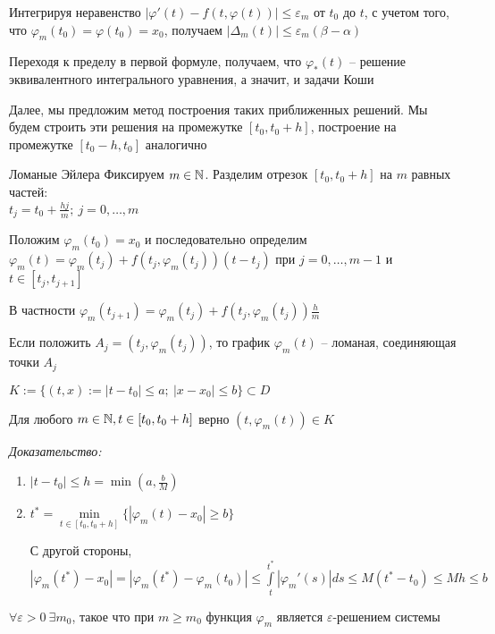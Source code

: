 \documentclass[12pt]{article}
\begin{document}
Интегрируя неравенство $|\varphi'(t) - f(t, \varphi(t))| \leq \varepsilon_m$ от $t_0$ до $t$, с учетом того, что $\varphi_m(t_0) = \varphi(t_0) = x_0$, получаем $|\Delta_m(t)| \leq \varepsilon_m(\beta - \alpha)$

Переходя к пределу в первой формуле, получаем, что $\varphi_*(t)$ -- решение эквивалентного интегрального уравнения, а значит, и задачи Коши 

\begin{Remark}{}
    Далее, мы предложим метод построения таких приближенных решений. Мы будем строить эти решения на промежутке $[t_0, t_0 + h]$, построение на промежутке $[t_0 - h, t_0]$ аналогично
\end{Remark}

\begin{defin}{Ломаные Эйлера}
    Фиксируем $m \in \mathbb N$. Разделим отрезок $[t_0, t_0 + h]$ на $m$ равных частей: \\ $t_j = t_0 + \frac{hj}{m};\ j = 0, \ldots, m$

    Положим $\varphi_m(t_0) = x_0$ и последовательно определим $\varphi_m(t) = \varphi_m(t_j) + f(t_j, \varphi_m(t_j))(t - t_j)$ при $j = 0, \ldots, m - 1$ и $t \in [t_j, t_{j + 1}]$

    В частности $\varphi_m(t_{j + 1}) = \varphi_m(t_j) + f(t_j, \varphi_m(t_j))\frac{h}{m}$

    Если положить $A_j = (t_j, \varphi_m(t_j))$, то график $\varphi_m(t)$ -- ломаная, соединяющая точки $A_j$
\end{defin}

\begin{propos}{}
    $K := \{(t, x) := |t - t_0| \leq a;\ |x - x_0| \leq b\} \subset D$

    Для любого $m \in \mathbb N, t \in [t_0, t_0 + h]$ верно $(t, \varphi_m(t)) \in K$
\end{propos}

\textit{Доказательство:}

\begin{enumerate}
    \item $|t - t_0| \leq h = \min(a, \frac{b}{M})$
    \item $t^* = \min\limits_{t \in [t_0, t_0 + h]} \{|\varphi_m(t) - x_0| \geq b\}$
    
    С другой стороны, $|\varphi_m(t^*) - x_0| = |\varphi_m(t^*) - \varphi_m(t_0)| \leq \int\limits_t^{t^*} |\varphi_m'(s)|ds \leq M(t^* - t_0) \leq Mh \leq b$
\end{enumerate}

\begin{propos}{}
    $\forall \varepsilon > 0\ \exists m_0$, такое что при $m \geq m_0$ функция $\varphi_m$ является $\varepsilon$-решением системы 
\end{propos}
\end{document}
